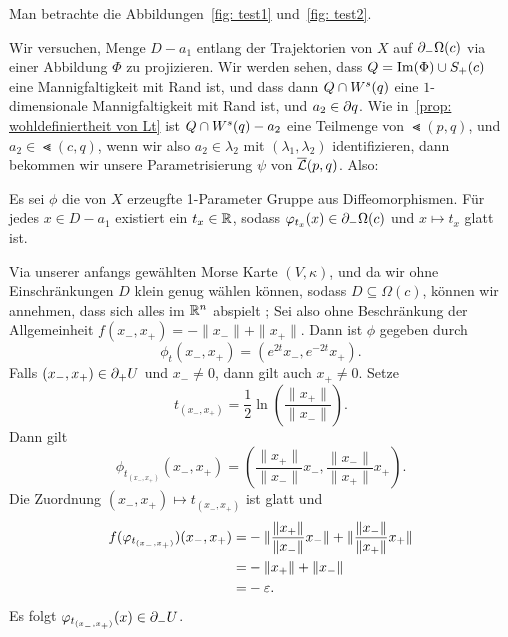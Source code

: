 \begin{bigproof}

    Man betrachte die Abbildungen~\ref{fig: test1} und~\ref{fig: test2}.

    Wir versuchen, Menge $D - a_1$ entlang der Trajektorien von $X$ auf ${ \partial }_- \Omega(c)$ via einer 
    Abbildung $\Phi$ zu projizieren. Wir werden sehen, dass $Q = { \operatorname{Im} } (\Phi) \cup S_+(c)$ eine 
    Mannigfaltigkeit mit Rand ist, und dass dann $Q \cap { W^s } (q)$ eine $1$-dimensionale
    Mannigfaltigkeit mit Rand ist, und $a_2 \in { \partial } q$. Wie in~\ref{prop: wohldefiniertheit von Lt} 
    ist $Q \cap { W^s } (q) - a_2$ eine Teilmenge von $\Lt (p, q)$, und $a_2 \in \Lt (c, q)$, 
    wenn wir also $a_2 \in \lambda_2$ mit $(\lambda_1, \lambda_2)$ identifizieren, dann bekommen 
    wir unsere Parametrisierung $\psi$ von ${\overline{\mathcal{L}} } (p, q)$. 
    Also:

    \begin{claim}
        Es sei $\phi$ die von $X$ erzeugfte 1-Parameter Gruppe aus Diffeomorphismen. Für jedes 
        $x \in D - a_1$ existiert ein $t_x \in { \mathbb R }$, sodass $\varphi_{t_x} (x) \in { \partial }_- \Omega (c)$
        und $x \mapsto t_x$ glatt ist.
    \end{claim}

    \begin{smallproof}
        Via unserer anfangs gewählten Morse Karte $(V, \kappa)$, und da wir ohne Einschränkungen $D$ 
        klein genug wählen können, sodass $D \subseteq \Omega (c)$, können wir annehmen, dass sich 
        alles im ${ \mathbb R }^n$ abspielt ; Sei also ohne Beschränkung der Allgemeinheit 
        $f(x_-, x_+) = - \|x_-\| + \|x_+\|$. Dann ist $\phi$ gegeben durch 
        \[ \phi_t(x_-, x_+) = (e^{2t}x_-, e^{-2t}x_+) . \]
        Falls $(x_-, x_+) \in { \partial }_+ U$ und $x_- \neq 0$, dann gilt auch $x_+ \neq 0$. Setze
        \[ t_{(x_-, x_+)} = \frac{1}{2} \ln \left( \frac{\| x_+ \|}{\| x_- \|} \right) . \]
        Dann gilt
        \[ \phi_{t_{(x_-, x_+)}} (x_-, x_+) = 
            \left( \frac{\| x_+ \|}{\| x_- \|} x_-, \frac{\| x_- \|}{\| x_+ \|} x_+ \right) . \]
        Die Zuordnung $(x_-, x_+) \mapsto t_{(x_-, x_+)}$ ist glatt und 
        \begin{align*}
            f(\varphi_{t_{(x_-, x_+)}})(x_-, x_+) = & - \| \frac{\| x_+ \|}{\| x_- \|} x_- \|
                +  \| \frac{\| x_- \|}{\| x_+ \|} x_+ \| \\
                = & - \| x_+ \| + \| x_- \| \\
                = & - \varepsilon .
        \end{align*}
        Es folgt $\varphi_{t_{(x_-, x_+)}} (x) \in { \partial }_- U$.
    \end{smallproof}


\end{bigproof}
